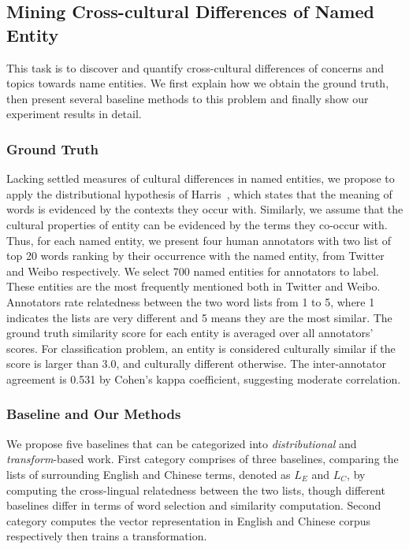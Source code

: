 \subsection{Mining Cross-cultural Differences of Named Entity}
\label{sec:mcdne}
This task is to discover and quantify cross-cultural differences of concerns and topics towards name entities. We first explain how we obtain the ground truth, then present several baseline methods to this problem and finally 
show our experiment results in detail.

\subsubsection{Ground Truth}
Lacking settled measures of cultural differences in named entities, we propose to apply the distributional hypothesis of Harris~, which states that the meaning of words is evidenced by the contexts 
they occur with. 
Similarly, we assume that the cultural properties of entity can be evidenced 
by the terms they co-occur with. 
Thus, for each named entity, we present four human annotators with two list of top 20 words ranking by their occurrence with the named entity, from Twitter and Weibo respectively. We select 700 named entities for annotators to label. These entities
are the most frequently mentioned both in Twitter and Weibo. 
Annotators rate relatedness between the two word lists from 1 to 5, 
where 1 indicates the lists are very different and 5 means they are 
the most similar. The ground truth similarity score 
for each entity is averaged over all annotators' scores. For classification problem, an entity 
is considered culturally similar if the score is larger than 3.0, and culturally different otherwise.
The inter-annotator agreement is 0.531 by Cohen's kappa coefficient, suggesting moderate correlation.

\subsubsection{Baseline and Our Methods}

We propose five baselines that can be categorized into \emph{distributional} and \emph{transform}-based
work.
First category comprises of three baselines, comparing the lists of surrounding
 English and Chinese terms, denoted as $L_E$ and $L_C$, by computing
 the cross-lingual relatedness between the two lists, though different baselines differ in terms of word selection and similarity computation.
Second category computes the vector representation in English and Chinese corpus respectively
then trains a transformation.

